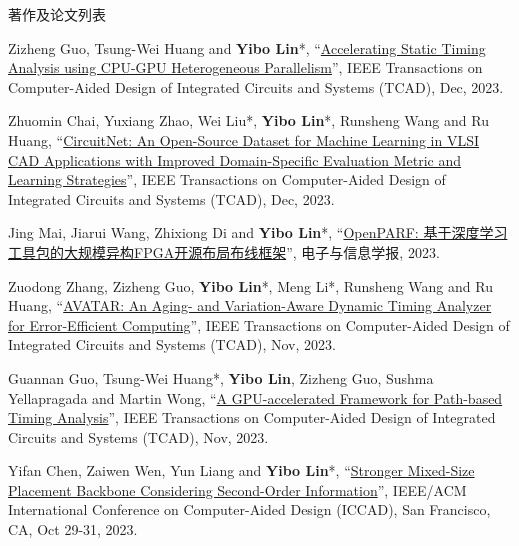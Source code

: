 \begin{rSection}{著作及论文列表}
\begin{description}[font=\normalfont, rightmargin=2em]
{}
            

\item[{[J134]}]{
        Zizheng Guo, Tsung-Wei Huang and \textbf{Yibo Lin}*, 
    ``\href{https://doi.org/10.1109/TCAD.2023.3286261}{Accelerating Static Timing Analysis using CPU-GPU Heterogeneous Parallelism}'', 
    IEEE Transactions on Computer-Aided Design of Integrated Circuits and Systems (TCAD), Dec, 2023.
    
}
            

\item[{[J133]}]{
        Zhuomin Chai, Yuxiang Zhao, Wei Liu*, \textbf{Yibo Lin}*, Runsheng Wang and Ru Huang, 
    ``\href{https://doi.org/10.1109/TCAD.2023.3287970}{CircuitNet: An Open-Source Dataset for Machine Learning in VLSI CAD Applications with Improved Domain-Specific Evaluation Metric and Learning Strategies}'', 
    IEEE Transactions on Computer-Aided Design of Integrated Circuits and Systems (TCAD), Dec, 2023.
    
}
            

\item[{[J132]}]{
        Jing Mai, Jiarui Wang, Zhixiong Di and \textbf{Yibo Lin}*, 
    ``\href{https://jeit.ac.cn/cn/article/doi/10.11999/JEIT230387}{OpenPARF: 基于深度学习工具包的大规模异构FPGA开源布局布线框架}'', 
    电子与信息学报, 2023.
    
}
            

\item[{[J131]}]{
        Zuodong Zhang, Zizheng Guo, \textbf{Yibo Lin}*, Meng Li*, Runsheng Wang and Ru Huang, 
    ``\href{https://doi.org/10.1109/TCAD.2023.3255167}{AVATAR: An Aging- and Variation-Aware Dynamic Timing Analyzer for Error-Efficient Computing}'', 
    IEEE Transactions on Computer-Aided Design of Integrated Circuits and Systems (TCAD), Nov, 2023.
    
}
            

\item[{[J130]}]{
        Guannan Guo, Tsung-Wei Huang*, \textbf{Yibo Lin}, Zizheng Guo, Sushma Yellapragada and Martin Wong, 
    ``\href{https://doi.org/10.1109/TCAD.2023.3272274}{A GPU-accelerated Framework for Path-based Timing Analysis}'', 
    IEEE Transactions on Computer-Aided Design of Integrated Circuits and Systems (TCAD), Nov, 2023.
    
}
            

\item[{[C129]}]{
        Yifan Chen, Zaiwen Wen, Yun Liang and \textbf{Yibo Lin}*, 
    ``\href{https://doi.org/10.1109/ICCAD57390.2023.10323700}{Stronger Mixed-Size Placement Backbone Considering Second-Order Information}'', 
    IEEE/ACM International Conference on Computer-Aided Design (ICCAD), San Francisco, CA, Oct 29-31, 2023.
    
}
\end{description}
\end{rSection}

